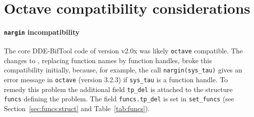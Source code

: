 \documentclass[10pt]{scrartcl}
\newcommand{\blist}[1]{\mbox{\lstinline!#1!}}
\begin{document}
{%


\section{Octave compatibility  considerations}
\label{sec:octave}
\paragraph{\blist{nargin} incompatibility} The core DDE-BifTool code
of version v2.0x was likely \texttt{octave} compatible. The changes to \version{},
replacing function names by function handles, broke this compatibility
initially, because, for example, the call \blist{nargin(sys_tau)}
gives an error message in \texttt{octave} (version 3.2.3) if
\blist{sys_tau} is a function handle. To remedy this problem the
additional field \blist{tp_del} is attached to the structure
\blist{funcs} defining the problem. The field \blist{funcs.tp_del} is
set in \blist{set_funcs} (see Section~\ref{sec:funcs:struct} and
Table~\ref{tab:funcs}).

}
\end{document}
